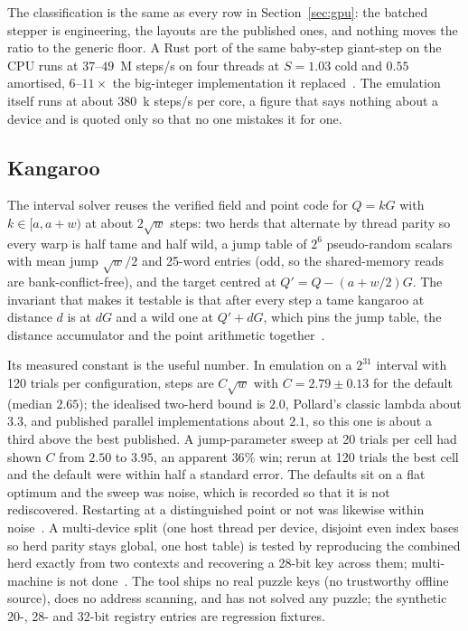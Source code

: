 The classification is the same as every row in Section~\ref{sec:gpu}:
the batched stepper is engineering, the layouts are the published
ones, and nothing moves the ratio to the generic floor. A Rust port of
the same baby-step giant-step on the CPU runs at $37$--$49$~M
steps/s on four threads at $S=1.03$ cold and $0.55$ amortised, $6$--$11\times$
the big-integer implementation it replaced~.
The emulation itself runs at about $380$~k steps/s per core, a
figure that says nothing about a device and is quoted only so that
no one mistakes it for one.

\subsection{Kangaroo}
\label{sec:othergpu-kangaroo}

The interval solver reuses the verified field and point code for
$Q=kG$ with $k\in[a,a+w)$ at about $2\sqrt w$ steps: two herds that
alternate by thread parity so every warp is half tame and half wild,
a jump table of $2^6$ pseudo-random scalars with mean jump $\sqrt w/2$
and 25-word entries (odd, so the shared-memory reads are
bank-conflict-free), and the target centred at $Q'=Q-(a+w/2)G$. The
invariant that makes it testable is that after every step a tame
kangaroo at distance $d$ is at $dG$ and a wild one at $Q'+dG$, which
pins the jump table, the distance accumulator and the point
arithmetic together~.

Its measured constant is the useful number. In emulation on a $2^{31}$
interval with 120 trials per configuration, steps are $C\sqrt w$ with
$C=2.79\pm0.13$ for the default (median $2.65$); the idealised
two-herd bound is $2.0$, Pollard's classic lambda about $3.3$, and
published parallel implementations about $2.1$, so this one is about a
third above the best published. A jump-parameter sweep at 20 trials
per cell had shown $C$ from $2.50$ to $3.95$, an apparent $36\%$ win;
rerun at 120 trials the best cell and the default were within half a
standard error. The defaults sit on a flat optimum and the sweep was
noise, which is recorded so that it is not rediscovered. Restarting
at a distinguished point or not was likewise within
noise~. A multi-device
split (one host thread per device, disjoint even index bases so herd
parity stays global, one host table) is tested by reproducing the
combined herd exactly from two contexts and recovering a 28-bit key
across them; multi-machine is not done~.
The tool ships no real puzzle keys (no trustworthy offline source),
does no address scanning, and has not solved any puzzle; the
synthetic 20-, 28- and 32-bit registry entries are regression fixtures.

